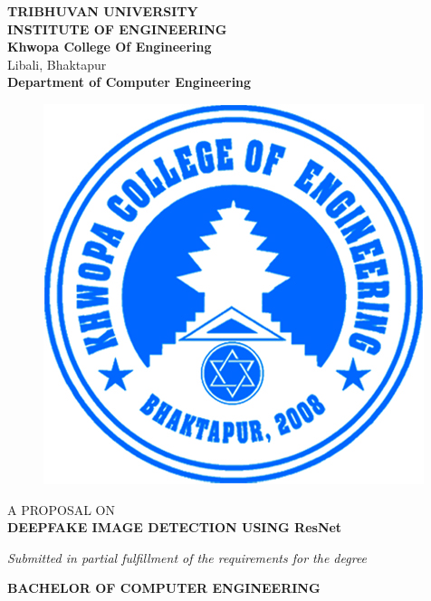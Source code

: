     \begin{center}
		\thispagestyle{empty}
		\Large\textbf{TRIBHUVAN UNIVERSITY}\\
		\Large\textbf{INSTITUTE OF ENGINEERING }\\
		\vspace{0.2in}
		\large{\textbf{Khwopa College Of Engineering}\\}
		\normalsize{Libali, Bhaktapur\\}
		\large\textbf{Department of Computer Engineering}
		\vspace{0.2in}
		\begin{figure}[h]
		    \centering
			    \includegraphics{img/Khwopalogo.jpg}
		\end{figure}
		
		\vspace{0.2in}
		\large{A PROPOSAL ON\\\textbf{DEEPFAKE IMAGE  DETECTION USING ResNet}\\}
	
		\vspace{0.2in}
		\large{\textit{Submitted in partial fulfillment of the requirements for the degree\\}}
		
		\vspace{0.2in}
		\large{\textbf{BACHELOR OF COMPUTER ENGINEERING}\\}
		

\end{center}
